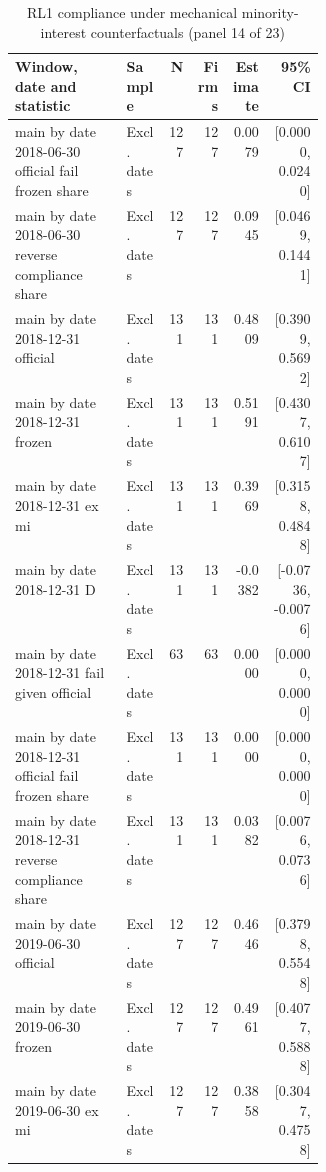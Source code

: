 \begin{table}[!htbp]\centering\scriptsize
\caption{RL1 compliance under mechanical minority-interest counterfactuals (panel 14 of 23)}
\begin{threeparttable}
\begin{tabular}{p{0.36\linewidth}lrrrr}
\toprule
Window, date and statistic & Sample & N & Firms & Estimate & 95\% CI \\
\midrule
main by date 2018-06-30 official fail frozen share & Excl. dates & 127 & 127 & 0.0079 & [0.0000, 0.0240] \\
main by date 2018-06-30 reverse compliance share & Excl. dates & 127 & 127 & 0.0945 & [0.0469, 0.1441] \\
main by date 2018-12-31 official & Excl. dates & 131 & 131 & 0.4809 & [0.3909, 0.5692] \\
main by date 2018-12-31 frozen & Excl. dates & 131 & 131 & 0.5191 & [0.4307, 0.6107] \\
main by date 2018-12-31 ex mi & Excl. dates & 131 & 131 & 0.3969 & [0.3158, 0.4848] \\
main by date 2018-12-31 D & Excl. dates & 131 & 131 & -0.0382 & [-0.0736, -0.0076] \\
main by date 2018-12-31 fail given official & Excl. dates & 63 & 63 & 0.0000 & [0.0000, 0.0000] \\
main by date 2018-12-31 official fail frozen share & Excl. dates & 131 & 131 & 0.0000 & [0.0000, 0.0000] \\
main by date 2018-12-31 reverse compliance share & Excl. dates & 131 & 131 & 0.0382 & [0.0076, 0.0736] \\
main by date 2019-06-30 official & Excl. dates & 127 & 127 & 0.4646 & [0.3798, 0.5548] \\
main by date 2019-06-30 frozen & Excl. dates & 127 & 127 & 0.4961 & [0.4077, 0.5888] \\
main by date 2019-06-30 ex mi & Excl. dates & 127 & 127 & 0.3858 & [0.3047, 0.4758] \\
\bottomrule
\end{tabular}
\begin{tablenotes}[flushleft]\footnotesize

\end{tablenotes}
\end{threeparttable}
\end{table}
